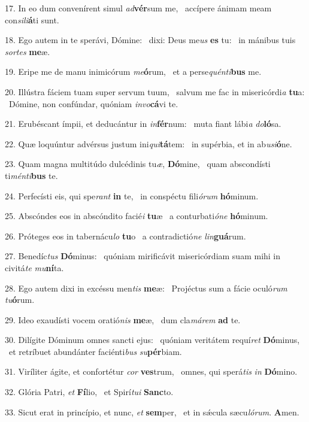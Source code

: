 17. In eo dum convenírent simul \textit{ad}\textbf{vér}sum me, \ast\  accípere ánimam meam con\textit{si}\textit{li}\textbf{á}ti sunt.\

18. Ego autem in te sperávi, Dómine: \dag\  dixi: Deus me\textit{us} \textbf{es} tu: \ast\  in mánibus tuis \textit{sor}\textit{tes} \textbf{me}æ.\

19. Eripe me de manu inimicórum \textit{me}\textbf{ó}rum, \ast\  et a perse\textit{quén}\textit{ti}\textbf{bus} me.\

20. Illústra fáciem tuam super servum tuum, \dag\  salvum me fac in misericórdi\textit{a} \textbf{tu}a: \ast\  Dómine, non confúndar, quóniam \textit{in}\textit{vo}\textbf{cá}vi te.\

21. Erubéscant ímpii, et deducántur in \textit{in}\textbf{fér}num: \ast\  muta fiant lábi\textit{a} \textit{do}\textbf{ló}sa.\

22. Quæ loquúntur advérsus justum ini\textit{qui}\textbf{tá}tem: \ast\  in supérbia, et in ab\textit{u}\textit{si}\textbf{ó}ne.\

23. Quam magna multitúdo dulcédinis tu\textit{æ}, \textbf{Dó}mine, \ast\  quam abscondísti ti\textit{mén}\textit{ti}\textbf{bus} te.\

24. Perfecísti eis, qui spe\textit{rant} \textbf{in} te, \ast\  in conspéctu fili\textit{ó}\textit{rum} \textbf{hó}minum.\

25. Abscóndes eos in abscóndito facié\textit{i} \textbf{tu}æ \ast\  a conturbati\textit{ó}\textit{ne} \textbf{hó}minum.\

26. Próteges eos in tabernácu\textit{lo} \textbf{tu}o \ast\  a contradictió\textit{ne} \textit{lin}\textbf{guá}rum.\

27. Benedíc\textit{tus} \textbf{Dó}minus: \ast\  quóniam mirificávit misericórdiam suam mihi in civitá\textit{te} \textit{mu}\textbf{ní}ta.\

28. Ego autem dixi in excéssu men\textit{tis} \textbf{me}æ: \ast\  Projéctus sum a fácie oculó\textit{rum} \textit{tu}\textbf{ó}rum.\

29. Ideo exaudísti vocem oratió\textit{nis} \textbf{me}æ, \ast\  dum cla\textit{má}\textit{rem} \textbf{ad} te.\

30. Dilígite Dóminum omnes sancti ejus: \dag\  quóniam veritátem requí\textit{ret} \textbf{Dó}minus, \ast\  et retríbuet abundánter faciénti\textit{bus} \textit{su}\textbf{pér}biam.\

31. Viríliter ágite, et confortétur \textit{cor} \textbf{ves}trum, \ast\  omnes, qui sperá\textit{tis} \textit{in} \textbf{Dó}mino.\

32. Glória Patri, \textit{et} \textbf{Fí}lio, \ast\  et Spirí\textit{tu}\textit{i} \textbf{Sanc}to.\

33. Sicut erat in princípio, et nunc, \textit{et} \textbf{sem}per, \ast\  et in sǽcula sæcu\textit{ló}\textit{rum}. \textbf{A}men.\

